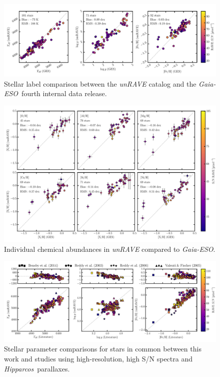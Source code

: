\documentclass[preprint,trackchanges]{aastex}
\newcommand{\project}[1]{\textsl{#1}}
\newcommand{\ges}{\project{Gaia-ESO}}
\newcommand{\hipparcos}{\project{Hipparcos}}
\begin{document}
\begin{figure}[p]
\includegraphics[width=\textwidth]{figures/ges-comparison.pdf}
\caption{Stellar label comparison between the \project{unRAVE} catalog and the \ges\ fourth internal data release.\label{fig:ges-stellar-parameters}}
\end{figure}


\begin{figure}[p]
\includegraphics[width=\textwidth]{figures/ges-abundances.pdf}
\caption{Individual chemical abundances in \project{unRAVE} compared to \ges.\label{fig:ges-abundances}}
\end{figure}


\begin{figure}[p]
\includegraphics[width=\textwidth]{figures/gold-standard-comparison.pdf}
\caption{Stellar parameter comparisons for stars in common between this work and studies using high-resolution, high S/N spectra and \hipparcos\ parallaxes.\label{fig:gold-standard-comparison}}
\end{figure}
\end{document}
